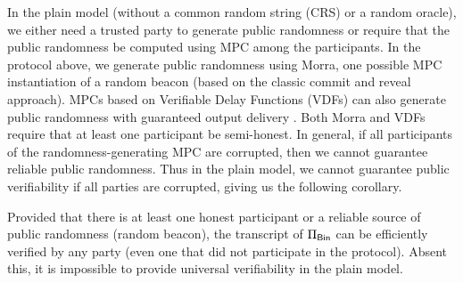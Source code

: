 In the plain model (without a common random string (CRS) or a random oracle), we either need a trusted party to generate public randomness or require that the public randomness be computed using MPC among the participants.
In the protocol above, we generate public randomness using Morra, one possible MPC instantiation of a random beacon (based on the classic commit and reveal approach). 
MPCs based on Verifiable Delay Functions (VDFs) can also generate public randomness with guaranteed output delivery \cite{boneh2018verifiable}.
 Both Morra and VDFs require that at least one participant be semi-honest. In general, if all participants of the randomness-generating MPC are corrupted, then we cannot guarantee reliable public randomness. 
Thus in the plain model, we cannot guarantee public verifiability if all parties are corrupted, giving us the following corollary. 

\begin{corollary}
\label{thm:impossible_public_verif}
Provided that there is at least one honest participant or a reliable source of public randomness (random beacon), the transcript of $\Pi_{\mathsf{Bin}}$ can be efficiently verified by any party (even one that did not participate in the protocol). Absent this, it is impossible to provide universal verifiability in the plain model.
\end{corollary}
